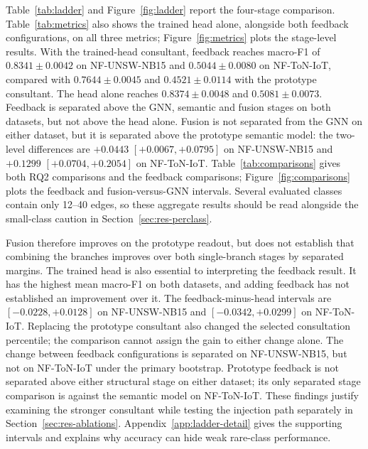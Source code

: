 Table~\ref{tab:ladder} and Figure~\ref{fig:ladder} report the four-stage comparison. Table~\ref{tab:metrics} also shows the trained head alone, alongside both feedback configurations, on all three metrics; Figure~\ref{fig:metrics} plots the stage-level results. With the trained-head consultant, feedback reaches macro-F1 of $0.8341 \pm 0.0042$ on NF-UNSW-NB15 and $0.5044 \pm 0.0080$ on NF-ToN-IoT, compared with $0.7644 \pm 0.0045$ and $0.4521 \pm 0.0114$ with the prototype consultant. The head alone reaches $0.8374 \pm 0.0048$ and $0.5081 \pm 0.0073$. Feedback is separated above the GNN, semantic and fusion stages on both datasets, but not above the head alone. Fusion is not separated from the GNN on either dataset, but it is separated above the prototype semantic model: the two-level differences are $+0.0443$ $[+0.0067, +0.0795]$ on NF-UNSW-NB15 and $+0.1299$ $[+0.0704, +0.2054]$ on NF-ToN-IoT. Table~\ref{tab:comparisons} gives both RQ2 comparisons and the feedback comparisons; Figure~\ref{fig:comparisons} plots the feedback and fusion-versus-GNN intervals. Several evaluated classes contain only 12--40 edges, so these aggregate results should be read alongside the small-class caution in Section~\ref{sec:res-perclass}.

Fusion therefore improves on the prototype readout, but does not establish that combining the branches improves over both single-branch stages by separated margins. The trained head is also essential to interpreting the feedback result. It has the highest mean macro-F1 on both datasets, and adding feedback has not established an improvement over it. The feedback-minus-head intervals are $[-0.0228, +0.0128]$ on NF-UNSW-NB15 and $[-0.0342, +0.0299]$ on NF-ToN-IoT. Replacing the prototype consultant also changed the selected consultation percentile; the comparison cannot assign the gain to either change alone. The change between feedback configurations is separated on NF-UNSW-NB15, but not on NF-ToN-IoT under the primary bootstrap. Prototype feedback is not separated above either structural stage on either dataset; its only separated stage comparison is against the semantic model on NF-ToN-IoT. These findings justify examining the stronger consultant while testing the injection path separately in Section~\ref{sec:res-ablations}. Appendix~\ref{app:ladder-detail} gives the supporting intervals and explains why accuracy can hide weak rare-class performance.



